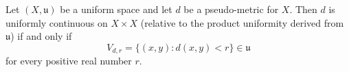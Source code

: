 Let $(X, \mathfrak{u})$ be a uniform space and let $d$ be a pseudo-metric for $X$. Then $d$ is uniformly continuous on $X \times X$ (relative to the product uniformity derived from $\mathfrak{u}$) if and only if
$$V_{d,r} = \{(x,y) : d(x,y) < r\} \in \mathfrak{u}$$
for every positive real number $r$.
